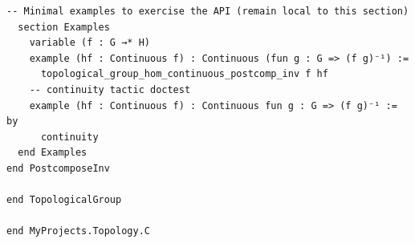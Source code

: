\documentclass[11pt]{article}
\theoremstyle{definition}
\begin{document}
\begin{lstlisting}[language=lean]
  -- Minimal examples to exercise the API (remain local to this section)
  section Examples
    variable (f : G →* H)
    example (hf : Continuous f) : Continuous (fun g : G => (f g)⁻¹) :=
      topological_group_hom_continuous_postcomp_inv f hf
    -- continuity tactic doctest
    example (hf : Continuous f) : Continuous fun g : G => (f g)⁻¹ := by
      continuity
  end Examples
end PostcomposeInv

end TopologicalGroup

end MyProjects.Topology.C

\end{lstlisting}
\end{document}
